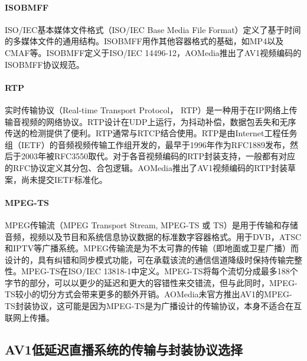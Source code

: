 \paragraph{ISOBMFF} ISO/IEC基本媒体文件格式（ISO/IEC Base Media File Format）定义了基于时间的多媒体文件的通用结构。ISOBMFF用作其他容器格式的基础，如MP4以及CMAF等。ISOBMFF定义于ISO/IEC 14496-12\cite{InformationTechnologyCoding}，AOMedia推出了AV1视频编码的ISOBMFF协议规范\cite{concolatoAV1CodecISO}。

\paragraph{RTP} 实时传输协议（Real-time Transport Protocol， RTP）是一种用于在IP网络上传输音视频的网络协议。RTP设计在UDP上运行，为抖动补偿，数据包丢失和无序传送的检测提供了便利。RTP通常与RTCP结合使用。RTP是由Internet工程任务组（IETF）的音频视频传输工作组开发的，最早于1996年作为RFC1889\cite{audio-videotransportworkinggroupRTPTransportProtocol1996}发布，然后于2003年被RFC3550\cite{schulzrinneRTPTransportProtocol2003}取代。对于各音视频编码的RTP封装支持，一般都有对应的RFC协议定义其分包、合包逻辑。AOMedia推出了AV1视频编码的RTP封装草案\cite{RTPPayloadFormat}，尚未提交IETF标准化。

\paragraph{MPEG-TS} MPEG传输流（MPEG Transport Stream, MPEG-TS 或 TS）是用于传输和存储音频，视频以及节目和系统信息协议数据的标准数字容器格式。用于DVB，ATSC和IPTV等广播系统。MPEG传输流是为不太可靠的传输（即地面或卫星广播）而设计的，具有纠错和同步模式功能，可在承载该流的通信信道降级时保持传输完整性。MPEG-TS在ISO/IEC 13818-1\cite{InformationTechnologyGeneric}中定义。MPEG-TS将每个流切分成最多188个字节的部分，可以以更少的延迟和更大的容错性来交错流，但与此同时，MPEG-TS较小的切分方式会带来更多的额外开销。AOMedia未官方推出AV1的MPEG-TS封装协议，这可能是因为MPEG-TS是为广播设计的传输协议，本身不适合在互联网上传播。



\subsection{AV1低延迟直播系统的传输与封装协议选择}

